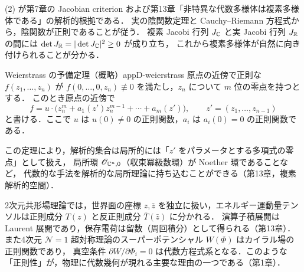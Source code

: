 (2) が第7章の Jacobian criterion および第13章「非特異な代数多様体は複素多様体である」の解析的根拠である．
実の陰関数定理と Cauchy--Riemann 方程式から，陰関数が正則であることが従う．
複素 Jacobi 行列 $J_{\mathbb{C}}$ と実 Jacobi 行列 $J_{\mathbb{R}}$ の間には $\det J_{\mathbb{R}}=|\det J_{\mathbb{C}}|^2\geq0$ が成り立ち，
これから複素多様体が自然に向き付けられることが分かる．

\begin{mythm}{Weierstrass の予備定理（概略）}{appD-weierstrass}
原点の近傍で正則な $f(z_1,\dots,z_n)$ が $f(0,\dots,0,z_n)\not\equiv0$ を満たし，$z_n$ について $m$ 位の零点を持つとする．
このとき原点の近傍で
\[
f=u\cdot\bigl(z_n^m+a_1(z')z_n^{m-1}+\cdots+a_m(z')\bigr),\qquad z'=(z_1,\dots,z_{n-1})
\]
と書ける．ここで $u$ は $u(0)\ne0$ の正則関数，$a_i$ は $a_i(0)=0$ の正則関数である．
\end{mythm}

この定理により，解析的集合は局所的には「$z'$ をパラメータとする多項式の零点」として扱え，
局所環 $\mathscr{O}_{\mathbb{C}^n,0}$（収束冪級数環）が Noether 環であることなど，
代数的な手法を解析的な局所理論に持ち込むことができる（第13章，複素解析的空間）．

\begin{physbox}[正則性と物理]
2次元共形場理論では，世界面の座標 $z,\bar z$ を独立に扱い，エネルギー運動量テンソルは正則成分 $T(z)$ と反正則成分 $\bar T(\bar z)$ に分かれる．
演算子積展開は Laurent 展開であり，保存電荷は留数（周回積分）として得られる（第13章）．
また4次元 $\mathcal N=1$ 超対称理論のスーパーポテンシャル $W(\Phi)$ はカイラル場の正則関数であり，
真空条件 $\partial W/\partial\Phi_i=0$ は代数方程式系となる．このような「正則性」が，物理に代数幾何が現れる主要な理由の一つである（第1章）．
\end{physbox}
